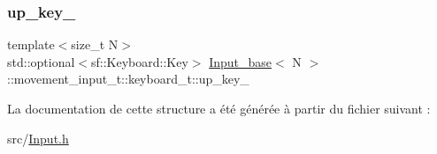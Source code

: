 \mbox{\label{struct_input__base_1_1movement__input__t_1_1keyboard__t_aa8136cb8a1daced841a7bf3349ae0efd}} 
\subsubsection{\texorpdfstring{up\+\_\+key\+\_\+}{up\_key\_}}
{\footnotesize\ttfamily template$<$size\+\_\+t N$>$ \\
std\+::optional$<$sf\+::\+Keyboard\+::\+Key$>$ \hyperlink{class_input__base}{Input\+\_\+base}$<$ N $>$\+::movement\+\_\+input\+\_\+t\+::keyboard\+\_\+t\+::up\+\_\+key\+\_\+}



La documentation de cette structure a été générée à partir du fichier suivant \+:\begin{DoxyCompactItemize}
\item 
src/\hyperlink{_input_8h}{Input.\+h}\end{DoxyCompactItemize}
